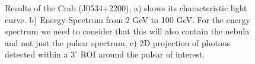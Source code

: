 \documentclass{PoS}
\begin{document}
\begin{figure}
\centering
{}
\caption{Results of the Crab (J0534+2200), a)  shows its characteristic  light curve. b) Energy Spectrum from 2 GeV to 100 GeV. For the energy spectrum we need to consider that this will also contain the nebula and not just the pulsar spectrum, c) 2D projection of photons detected within a $ 3^{\circ}$ ROI around the pulsar of interest.}\label{crab}
\end{figure}
\end{document}
